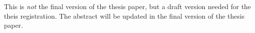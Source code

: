 \begin{comment}
    The abstract should be a concise summary of what you have done.
It should cover, in roughly 1 to 2 sentences per topic:
\begin{itemize}
	\item The domain, i.e., explain the application domain in which your thesis is applicable.
	\item The problem, i.e., motivate what the problem is you are solving.
	\item The method, i.e., describe the method you have proposed, and, compare it, briefly \& high level to other approaches. In particular, focus on the benefits of your approach versus the other approach(es)
	\item The evaluation, i.e., how did you evaluate your method, what results did you obtain  and what do the results indicate?
\end{itemize}
\end{comment}

This is \emph{not} the final version of the thesis paper, but a draft version needed for the theis registration. The abstract will be updated in the final version of the thesis paper.
